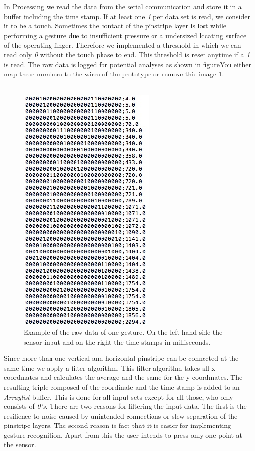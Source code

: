 In Processing we read the data from the serial communication and store it in a buffer including the time stamp.  If at least one \emph{1} per data set is read, we consider it to be a touch. Sometimes the contact of the pinstripe layer is lost while performing a gesture due to insufficient pressure or a undersized locating surface of the operating finger. Therefore we implemented a threshold in which we can read only \emph{0} without the touch phase to end. This threshold is reset anytime if a \emph{1} is read. The raw data is logged for potential analyses as shown in figureYou either map these numbers to the wires of the prototype or remove this image \ref{fig:rawDataExample}.\\ \\
\begin{figure}
\includegraphics[scale=0.7]{images/rawDataExample.jpg}
\caption{Example of the raw data of one gesture. On the left-hand side the sensor input and on the right the time stamps in milliseconds.}
\label{fig:rawDataExample}
\end{figure}Since more than one vertical and horizontal pinstripe can be connected at the same time we apply a filter algorithm. This filter algorithm takes all x-coordinates and calculates the average and the same for the y-coordinates. The resulting triple composed of the coordinate and the time stamp is added to an \emph{Arraylist} buffer. This is done for all input sets except for all those, who only consists of \emph{0's}. There are two reasons for filtering the input data. The first is the resilience to noise caused by unintended connections or slow separation of the pinstripe layers. The second reason is fact that it is easier for implementing gesture recognition. Apart from this the user intends to press only one point at the sensor.
